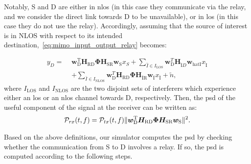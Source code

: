 Notably, S and D are either in \gls{nlos} (in this case they communicate via the relay, and we consider the direct link towards D to be unavailable), or in \gls{los} (in this case they do not use the relay). %
Accordingly, assuming that the source of interest is in NLOS with respect to its intended destination,~\eqref{eq:mimo_input_output_relay} becomes:

\begin{equation}
\label{eq:mimo_input_output_relay_reduced}
\begin{aligned}
    y_{D} = \,\, & \bm{w}_{\mathrm{D}}^{\mathrm{T}} \bm{H}_{\mathrm{RD}} \bm{\Phi} \bm{H}_{\mathrm{SR}} \bm{w}_{\mathrm{S}} x_{S} + \sum_{\hat{I} \in  I_{\mathrm{LOS}}} \bm{w}_{\mathrm{D}}^{T} \bm{H}_{\mathrm{\hat{I}} D}  \bm{w}_{\mathrm{hat{I}}} x_{\mathrm{\hat{I}}} \\
  & + \sum_{ \bar{I} \in I_{\mathrm{NLOS}}} \bm{w}_{\mathrm{D}}^{T} \bm{H}_{\mathrm{RD}} \bm{\Phi} \bm{H}_{\mathrm{\bar{I} R}}  \bm{w}_{\mathrm{\bar{I}}} x_{\mathrm{\bar{I}}} + \tilde{n},
\end{aligned}
\end{equation}
where $I_{\mathrm{LOS}}$ and $I_{\mathrm{NLOS}}$ are the two disjoint sets of interferers which experience either an \gls{los} or an \gls{nlos} channel towards D, respectively.
Then, the \gls{psd} of the useful component of the signal at the receiver can be written as:
\begin{equation}
\label{eq:psd_relay}
\mathcal{P}_{r x}(t, f) = \mathcal{P}_{t x}(t, f) \lVert \bm{w}_{\textrm D}^{\textrm T} \bm{H}_{\textrm {RD}} \bm{\Phi} \bm{H}_{\textrm {SR}} \bm{w}_{\textrm S} \rVert^2.
\end{equation}

Based on the above definitions, our simulator computes the \gls{psd} by checking whether the communication from S to D involves a relay. 
If so, the \gls{psd} is computed according to the following steps.

